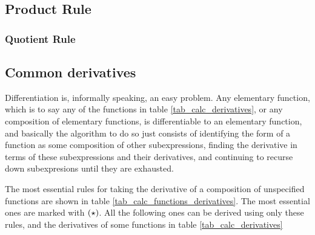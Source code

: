 \subsection{Product Rule} \label{sec_calc_product}

\subsubsection{Quotient Rule} \label{sec_calc_quotient}

\subsection{Common derivatives} \label{calc_common}


Differentiation is, informally speaking, an easy problem. Any elementary
function, which is to say any of the functions in table
\ref{tab_calc_derivatives}, or any composition of elementary functions, is
differentiable to an elementary function, and basically the algorithm to do
so just consists of identifying the form of a function as some composition
of other subexpressions, finding the derivative in terms of these
subexpressions and their derivatives, and continuing to recurse down
subexpresions until they are exhausted.

The most essential rules for taking the derivative of a composition of
unspecified functions are shown in table
\ref{tab_calc_functions_derivatives}. The most essential ones are marked
with \((\star)\). All the following ones can be derived using only these
rules, and the derivatives of some functions in table
\ref{tab_calc_derivatives}

